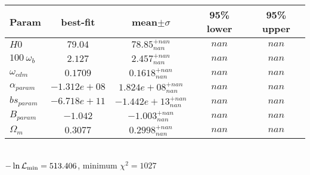 \begin{tabular}{|l|c|c|c|c|} 
 \hline 
Param & best-fit & mean$\pm\sigma$ & 95\% lower & 95\% upper \\ \hline 
$H0$ &$79.04$ & $78.85_{nan}^{+nan}$ & $nan$ & $nan$ \\ 
$100~\omega_{b }$ &$2.127$ & $2.457_{nan}^{+nan}$ & $nan$ & $nan$ \\ 
$\omega_{cdm }$ &$0.1709$ & $0.1618_{nan}^{+nan}$ & $nan$ & $nan$ \\ 
$\alpha_{param }$ &$-1.312e+08$ & $1.824e+08_{nan}^{+nan}$ & $nan$ & $nan$ \\ 
$bs_{param }$ &$-6.718e+11$ & $-1.442e+13_{nan}^{+nan}$ & $nan$ & $nan$ \\ 
$B_{param }$ &$-1.042$ & $-1.003_{nan}^{+nan}$ & $nan$ & $nan$ \\ 
$\Omega_{m }$ &$0.3077$ & $0.2998_{nan}^{+nan}$ & $nan$ & $nan$ \\ 
\hline 
 \end{tabular} \\ 
$-\ln{\cal L}_\mathrm{min} =513.406$, minimum $\chi^2=1027$ \\ 
